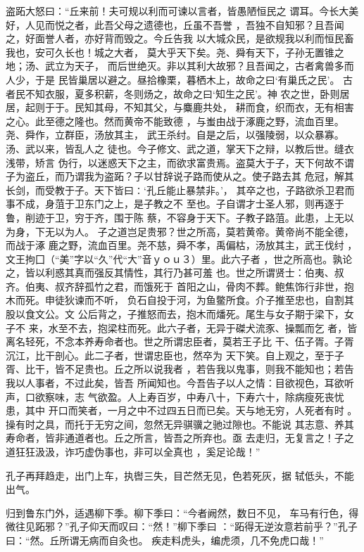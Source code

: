 \documentclass[]{article}
\begin{document}
盗跖大怒曰：``丘来前！夫可规以利而可谏以言者，皆愚陋恒民之
谓耳。今长大美好，人见而悦之者，此吾父母之遗德也，丘虽不吾誉
，吾独不自知邪？且吾闻之，好面誉人者，亦好背而毁之。今丘告我
以大城众民，是欲规我以利而恒民畜我也，安可久长也！城之大者，
莫大乎天下矣。尧、舜有天下，子孙无置锥之地；汤、武立为天子，
而后世绝灭。非以其利大故邪？且吾闻之，古者禽兽多而人少，于是
民皆巢居以避之。昼拾橡栗，暮栖木上，故命之曰`有巢氏之民'。
古者民不知衣服，夏多积薪，冬则炀之，故命之曰`知生之民'。神
农之世，卧则居居，起则于于。民知其母，不知其父，与麋鹿共处，
耕而食，织而衣，无有相害之心。此至德之隆也。然而黄帝不能致德
，与蚩由战于涿鹿之野，流血百里。尧、舜作，立群臣，汤放其主，
武王杀纣。自是之后，以强陵弱，以众暴寡。汤、武以来，皆乱人之
徒也。今子修文、武之道，掌天下之辩，以教后世。缝衣浅带，矫言
伪行，以迷惑天下之主，而欲求富贵焉。盗莫大于子，天下何故不谓
子为盗丘，而乃谓我为盗跖？子以甘辞说子路而使从之。使子路去其
危冠，解其长剑，而受教于子。天下皆曰∶`孔丘能止暴禁非。'，
其卒之也，子路欲杀卫君而事不成，身菹于卫东门之上，是子教之不
至也。子自谓才士圣人邪，则再逐于鲁，削迹于卫，穷于齐，围于陈
蔡，不容身于天下。子教子路菹。此患，上无以为身，下无以为人。
子之道岂足贵邪？世之所高，莫若黄帝。黄帝尚不能全德，而战于涿
鹿之野，流血百里。尧不慈，舜不孝，禹偏枯，汤放其主，武王伐纣
，文王拘囗（``美''字以``久''代``大''音ｙｏｕ３）里。此六子者
，世之所高也。孰论之，皆以利惑其真而强反其情性，其行乃甚可羞
也。世之所谓贤士：伯夷、叔齐。伯夷、叔齐辞孤竹之君，而饿死于
首阳之山，骨肉不葬。鲍焦饰行非世，抱木而死。申徒狄谏而不听，
负石自投于河，为鱼鳖所食。介子推至忠也，自割其股以食文公。文
公后背之，子推怒而去，抱木而燔死。尾生与女子期于梁下，女子不
来，水至不去，抱梁柱而死。此六子者，无异于磔犬流豕、操瓢而乞
者，皆离名轻死，不念本养寿命者也。世之所谓忠臣者，莫若王子比
干、伍子胥。子胥沉江，比干剖心。此二子者，世谓忠臣也，然卒为
天下笑。自上观之，至于子胥、比干，皆不足贵也。丘之所以说我者
，若告我以鬼事，则我不能知也；若告我以人事者，不过此矣，皆吾
所闻知也。今吾告子以人之情：目欲视色，耳欲听声，口欲察味，志
气欲盈。人上寿百岁，中寿八十，下寿六十，除病瘦死丧忧患，其中
开口而笑者，一月之中不过四五日而已矣。天与地无穷，人死者有时
。操有时之具，而托于无穷之间，忽然无异骐骥之驰过隙也。不能说
其志意、养其寿命者，皆非通道者也。丘之所言，皆吾之所弃也。亟
去走归，无复言之！子之道狂狂汲汲，诈巧虚伪事也，非可以全真也
，奚足论哉！''

孔子再拜趋走，出门上车，执辔三失，目芒然无见，色若死灰，据
轼低头，不能出气。

归到鲁东门外，适遇柳下季。柳下季曰：``今者阙然，数日不见，
车马有行色，得微往见跖邪？''孔子仰天而叹曰：``然！''柳下季曰
：``跖得无逆汝意若前乎？''孔子曰：``然。丘所谓无病而自灸也。
疾走料虎头，编虎须，几不免虎口哉！''
\end{document}
